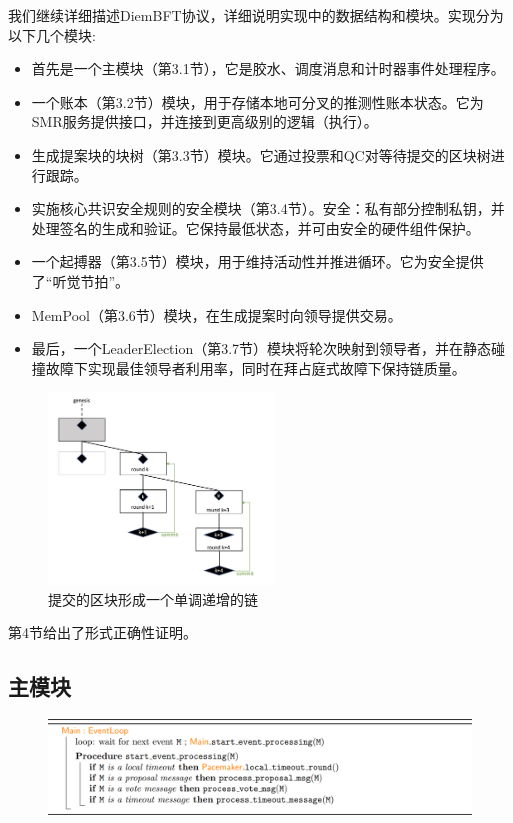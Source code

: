 我们继续详细描述DiemBFT协议，详细说明实现中的数据结构和模块。实现分为以下几个模块:
\begin{itemize}
    \item 首先是一个主模块（第3.1节），它是胶水、调度消息和计时器事件处理程序。
    \item 一个账本（第3.2节）模块，用于存储本地可分叉的推测性账本状态。它为SMR服务提供接口，并连接到更高级别的逻辑（执行）。
    \item 生成提案块的块树（第3.3节）模块。它通过投票和QC对等待提交的区块树进行跟踪。
    \item 实施核心共识安全规则的安全模块（第3.4节）。安全：私有部分控制私钥，并处理签名的生成和验证。它保持最低状态，并可由安全的硬件组件保护。
    \item 一个起搏器（第3.5节）模块，用于维持活动性并推进循环。它为安全提供了“听觉节拍”。
    \item MemPool（第3.6节）模块，在生成提案时向领导提供交易。
    \item 最后，一个LeaderElection（第3.7节）模块将轮次映射到领导者，并在静态碰撞故障下实现最佳领导者利用率，同时在拜占庭式故障下保持链质量。
\end{itemize}

\begin{figure}[htbp]
    \centering
    \includegraphics[width=6cm]{figures/image3.jpg}
    \caption{提交的区块形成一个单调递增的链}
    \label{image3}
\end{figure}

第4节给出了形式正确性证明。

\subsection{主模块}

\begin{figure}[htbp]
    \centering
    \includegraphics[width=12cm]{figures/code1.png}
\end{figure}

